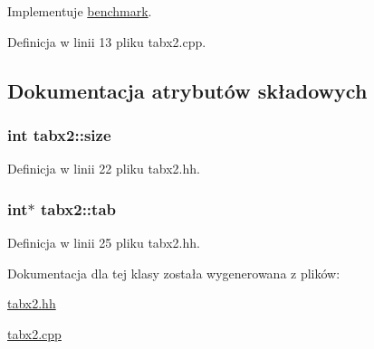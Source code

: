 Implementuje \hyperlink{classbenchmark_a698d333f815e6e12c0817b1dfee56e99}{benchmark}.



Definicja w linii 13 pliku tabx2.\-cpp.



\subsection{Dokumentacja atrybutów składowych}
\hypertarget{classtabx2_a9a6db4f12091baed13f8bad9b9538766}{
\subsubsection[{size}]{\setlength{\rightskip}{0pt plus 5cm}int tabx2\-::size\hspace{0.3cm}{\ttfamily [private]}}}\label{classtabx2_a9a6db4f12091baed13f8bad9b9538766}


Definicja w linii 22 pliku tabx2.\-hh.

\hypertarget{classtabx2_ae3ee40d58c1d3dc6a80c34ca63d337e9}{
\subsubsection[{tab}]{\setlength{\rightskip}{0pt plus 5cm}int$\ast$ tabx2\-::tab\hspace{0.3cm}{\ttfamily [private]}}}\label{classtabx2_ae3ee40d58c1d3dc6a80c34ca63d337e9}


Definicja w linii 25 pliku tabx2.\-hh.



Dokumentacja dla tej klasy została wygenerowana z plików\-:\begin{DoxyCompactItemize}
\item 
\hyperlink{tabx2_8hh}{tabx2.\-hh}\item 
\hyperlink{tabx2_8cpp}{tabx2.\-cpp}\end{DoxyCompactItemize}
